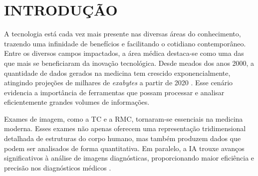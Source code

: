 \chapter{INTRODUÇÃO}
\label{chap:intro}

A tecnologia está cada vez mais presente nas diversas áreas do conhecimento, trazendo uma infinidade de benefícios e facilitando o cotidiano contemporâneo. Entre os diversos campos impactados, a área médica destaca-se como uma das que mais se beneficiaram da inovação tecnológica. Desde meados dos anos 2000, a quantidade de dados gerados na medicina tem crescido exponencialmente, atingindo projeções de milhares de \textit{exabytes} a partir de 2020 \cite{gantzDIGITALUNIVERSE2020}. Esse cenário evidencia a importância de ferramentas que possam processar e analisar eficientemente grandes volumes de informações.


Exames de imagem, como a \gls{TC} e a \gls{RMC}, tornaram-se essenciais na medicina moderna. Esses exames não apenas oferecem uma representação tridimensional detalhada de estruturas do corpo humano, mas também produzem dados que podem ser analisados de forma quantitativa. Em paralelo, a \gls{IA} trouxe avanços significativos à análise de imagens diagnósticas, proporcionando maior eficiência e precisão nos diagnósticos médicos \cite{argentieroApplicationsArtificialIntelligence2022}.


